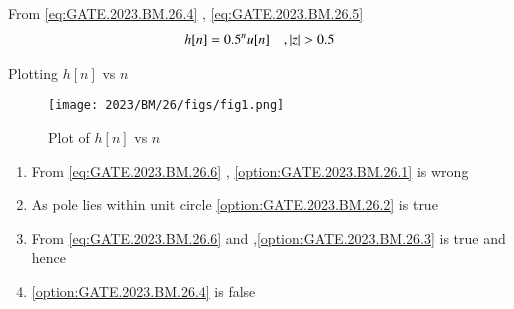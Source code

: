 \documentclass[journal,12pt,twocolumn]{IEEEtran}
\begin{document}
From \eqref{eq:GATE.2023.BM.26.4} , \eqref{eq:GATE.2023.BM.26.5}
\begin{align}
h[n] = 0.5^{n}u[n] \quad , \left\vert z\right\vert > 0.5 \label{eq:GATE.2023.BM.26.6}
\end{align}


\pagebreak
Plotting $h[n]$ vs $n$
\begin{figure}[h]
    \texttt{[image: 2023/BM/26/figs/fig1.png]}
    \caption{Plot of $h[n]$ vs $n$}
    \label{fig:GATE.2023.BM.26.1}
\end{figure}

\begin{enumerate}
\item From \eqref{eq:GATE.2023.BM.26.6} , \ref{option:GATE.2023.BM.26.1} is wrong
\item As pole lies within unit circle \ref{option:GATE.2023.BM.26.2} is true
\item From \eqref{eq:GATE.2023.BM.26.6} and  ,\ref{option:GATE.2023.BM.26.3} is true and hence
\item \ref{option:GATE.2023.BM.26.4} is false 
\end{enumerate}





\end{document}
